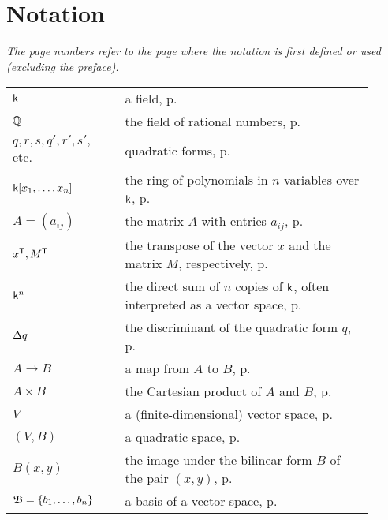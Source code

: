 \chapter*{Notation}

{\itshape\quad The page numbers refer to the page where the notation is first defined or used (excluding the preface).}

\bigskip

\begin{longtable}{p{0.25\linewidth} p{0.01\linewidth} p{0.65\linewidth}}
    \(\mathsf{k}\) && a field, p.\,\pageref{sec:quadratic-forms}\\
    \(\mathbb{Q}\) && the field of rational numbers, p.\,\pageref{sec:quadratic-forms}\\
    \(q, r, s, q', r', s',\) etc. && quadratic forms, p.\,\pageref{sec:quadratic-forms}\\
    \(\mathsf{k}[x_1, \dots, x_n]\) && the ring of polynomials in \(n\) variables over \(\mathsf{k}\), p.\,\pageref{sec:quadratic-forms}\\
    \(A = (a_{ij})\) && the matrix \(A\) with entries \(a_{ij}\), p.\,\pageref{sec:quadratic-forms-matrix-representation}\\
    \(x^{\mathsf{T}}, M^{\mathsf{T}}\) && the transpose of the vector \(x\) and the matrix \(M\), respectively, p.\,\pageref{sec:quadratic-forms-matrix-representation}\\
    \(\mathsf{k}^n\) && the direct sum of \(n\) copies of \(\mathsf{k}\), often interpreted as a vector space, p.\,\pageref{sec:quadratic-forms-matrix-representation}\\
    \({\Delta} q\) && the discriminant of the quadratic form \(q\), p.\,\pageref{sec:quadratic-forms-matrix-representation}\\
    \(A \to B\) && a map from \(A\) to \(B\), p.\,\pageref{sec:quadratic-maps}\\
    \(A \times B\) && the Cartesian product of \(A\) and \(B\), p.\,\pageref{sec:quadratic-maps}\\
    \(V\) && a (finite-dimensional) vector space, p.\,\pageref{sec:quadratic-maps}\\
    \((V, B)\) && a quadratic space, p.\,\pageref{sec:quadratic-maps}\\
    \(B(x, y)\) && the image under the bilinear form \(B\) of the pair \((x, y)\), p.\,\pageref{sec:quadratic-forms-basis}\\
    \(\mathfrak{B} = \{b_1, \dots, b_n\}\) && a basis of a vector space, p.\,\pageref{sec:quadratic-forms-basis}\\

\end{longtable}
